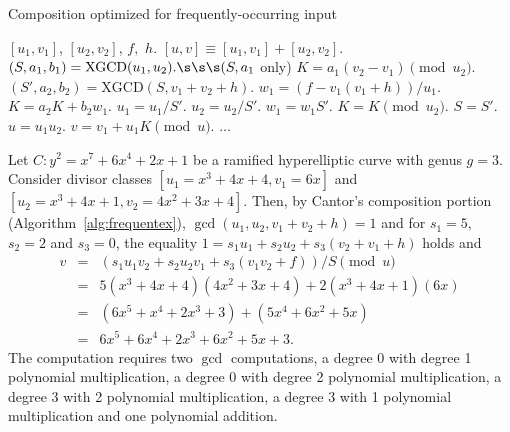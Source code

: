 \begin{center}
\begin{minipage}{0.75\textwidth} 
\begin{algorithm}[H]\label{alg:frequentcomp}
    \caption{Composition optimized for frequently-occurring input}
    \centering
    \begin{algorithmic}[1]
    \Require $[u_1,v_1]$, $[u_2,v_2]$, $f,$ $h.$
    \Ensure $[u,v] \equiv [u_1,v_1] + [u_2,v_2]$.
    \vspace{5pt}
    \State $(S,a_1,b_1) = \mathrm{XGCD}(u_1,u_2). \s\s\s  (S, a_1$ only)
    \State $K = a_1(v_2 - v_1) \pmod{u_2}.$
        \State $(S',a_2,b_2) = \mathrm{XGCD}(S,v_1 + v_2 + h)$.
        \State $w_1 = (f-v_1(v_1 + h))/u_1$.
        \State $K = a_2K + b_2w_1.$
            \State $u_1 = u_1/S'$.
            \State $u_2 = u_2/S'$.
            \State $w_1 = w_1S'$.
        \EndIf
        \State $K = K \pmod{u_2}$.
        \State $S = S'$.
    \EndIf
    \State $u = u_1u_2$.
    \State $v = v_1 + u_1K \pmod{u}$.
    \vspace{-6pt}
    \Statex ...
    \vspace{1pt}
    \end{algorithmic}
\end{algorithm}
\end{minipage}
\end{center}

\be
Let $C : y^2 = x^7 + 6x^4 + 2x + 1$ be a ramified hyperelliptic curve with genus
$g=3$. Consider divisor classes $[u_1 = x^3 + 4x + 4,v_1 = 6x ]$ and $[u_2 = x^3
+ 4x + 1,v_2 = 4x^2 + 3x + 4]$. Then, by Cantor's composition portion
(Algorithm~\ref{alg:frequentex}), $\gcd(u_1,u_2,v_1 + v_2 + h) = 1$ and for $s_1 =
5,$ $s_2 = 2$ and $s_3 = 0$, the equality $1 = s_1u_1 + s_2u_2 + s_3(v_2 + v_1 +
h)$ holds and
\begin{eqnarray*} v &=& (s_1u_1v_2 + s_2u_2v_1 + s_3(v_1v_2 + f))/S \pmod{u}\\
      &=& 5(x^3 + 4x + 4)(4x^2 + 3x + 4) + 2(x^3 + 4x + 1)(6x)\\
      &=& (6x^5 + x^4 + 2x^3 + 3) +  (5x^4 + 6x^2 + 5x)\\
      &=& 6x^5 + 6x^4 + 2x^3 + 6x^2 + 5x + 3.
\end{eqnarray*} 
The computation requires two $\gcd$ computations, a degree 0 with degree 1
polynomial multiplication, a degree 0 with degree 2 polynomial multiplication, a
degree 3 with 2 polynomial multiplication, a degree 3 with 1 polynomial
multiplication and one polynomial addition.

